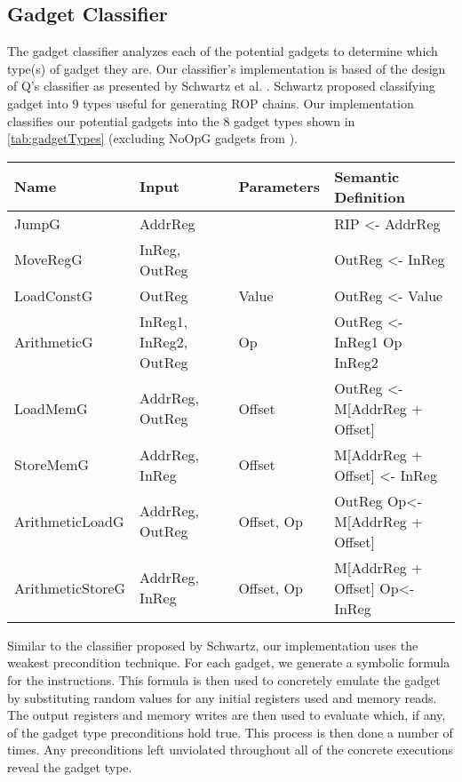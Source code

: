\documentclass[journal]{IEEEtran}
\begin{document}
\subsection{Gadget Classifier}
The gadget classifier analyzes each of the potential gadgets to determine which type(s) of gadget they are.
Our classifier's implementation is based of the design of Q's classifier as presented by Schwartz et al. \cite{schwartz2011q}.
Schwartz proposed classifying gadget into 9 types useful for generating ROP chains.
Our implementation classifies our potential gadgets into the 8 gadget types shown in \ref{tab:gadgetTypes} (excluding NoOpG gadgets from \cite{schwartz2011q}).

\begin{table*}[t]
  \begin{center}
    \begin{tabular}{ | l | l | l | l | }
    \hline
    Name & Input & Parameters & Semantic Definition \\
    \hline
    JumpG & AddrReg & & RIP <- AddrReg \\
    MoveRegG & InReg, OutReg & & OutReg <- InReg \\
    LoadConstG & OutReg & Value & OutReg <- Value \\
    ArithmeticG & InReg1, InReg2, OutReg & Op & OutReg <- InReg1 Op InReg2 \\
    LoadMemG & AddrReg, OutReg & Offset & OutReg <- M[AddrReg + Offset] \\
    StoreMemG & AddrReg, InReg & Offset & M[AddrReg + Offset] <- InReg \\
    ArithmeticLoadG & AddrReg, OutReg & Offset, Op & OutReg Op<-  M[AddrReg + Offset] \\
    ArithmeticStoreG & AddrReg, InReg & Offset, Op & M[AddrReg + Offset] Op<- InReg \\

      \hline
    \end{tabular}
    \caption{Gadget Types}
  \end{center}
  \label{tab:gadgetTypes}
\end{table*}

Similar to the classifier proposed by Schwartz, our implementation uses the weakest precondition technique.
For each gadget, we generate a symbolic formula for the instructions.
This formula is then used to concretely emulate the gadget by substituting random values for any initial registers used and memory reads.
The output registers and memory writes are then used to evaluate which, if any, of the gadget type preconditions hold true.
This process is then done a number of times.
Any preconditions left unviolated throughout all of the concrete executions reveal the gadget type.
\end{document}
